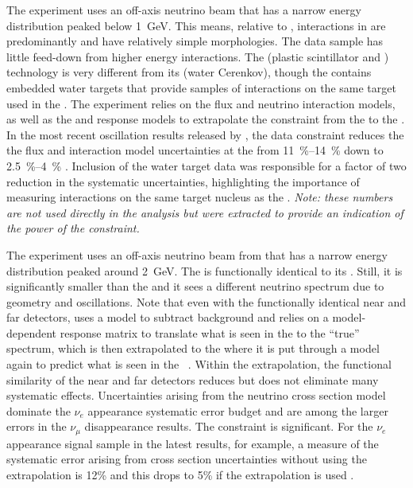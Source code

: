 The  experiment uses an off-axis neutrino beam that has a narrow energy distribution peaked below \SI{1}{GeV}. This means, relative to , interactions in  are predominantly  and have relatively simple morphologies.  The data sample has little feed-down from higher energy interactions.  The    (plastic scintillator and
 ) technology is very different from its    (water Cerenkov), though the  contains embedded water targets that provide samples of interactions on the same target used in the .
The experiment relies on the flux and neutrino interaction models, as well as the  and   response models to extrapolate the constraint from the   to the  .   In the most recent oscillation results released by , the   data constraint reduces the the flux and interaction model uncertainties at the   from \SIrange{11}{14}{\%} down to \SIrange{2.5}{4}{\%}  \cite{Abe:2018wpn}. Inclusion of the water target data was responsible for a factor of two reduction in the systematic uncertainties, highlighting the importance of measuring interactions on the same target nucleus as the .  {\em Note: these numbers are not used directly in the analysis but were extracted to provide an indication of the power of the  constraint.}

The    experiment uses an off-axis neutrino beam from  that has a narrow energy distribution peaked around \SI{2}{GeV}.  The      is functionally identical to its  .  Still, it is significantly smaller than the   and it sees a different neutrino spectrum due to geometry and oscillations.  Note that even with the functionally identical near and  far detectors,    uses a model to subtract  background and relies on a model-dependent response matrix to translate what is seen in the   to the ``true'' spectrum, which is then extrapolated to the   where it is put through a model again to predict what is seen in the  ~\cite{NOvA:2018gge, WolcottNUINT2018}.  Within the extrapolation, the functional similarity of the near and  far detectors reduces but does not eliminate many systematic effects.  Uncertainties arising from the neutrino cross section model dominate the    $\nu_{e}$ appearance systematic error budget and are among the larger errors in the $\nu_{\mu}$ disappearance results.  The   constraint is significant.  For the $\nu_{e}$ appearance signal sample in the latest    results, for example, a measure of the systematic error arising from cross section uncertainties without using the   extrapolation is 12\% and this drops to 5\% if the   extrapolation is used \cite{WolcottNUINT2018}.


